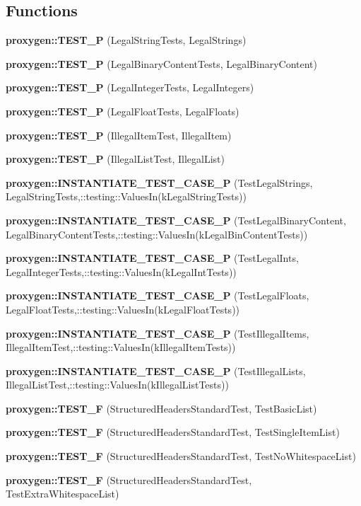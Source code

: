\subsection*{Functions}
\begin{DoxyCompactItemize}
\item 
{\bf proxygen\+::\+T\+E\+S\+T\+\_\+P} (Legal\+String\+Tests, Legal\+Strings)
\item 
{\bf proxygen\+::\+T\+E\+S\+T\+\_\+P} (Legal\+Binary\+Content\+Tests, Legal\+Binary\+Content)
\item 
{\bf proxygen\+::\+T\+E\+S\+T\+\_\+P} (Legal\+Integer\+Tests, Legal\+Integers)
\item 
{\bf proxygen\+::\+T\+E\+S\+T\+\_\+P} (Legal\+Float\+Tests, Legal\+Floats)
\item 
{\bf proxygen\+::\+T\+E\+S\+T\+\_\+P} (Illegal\+Item\+Test, Illegal\+Item)
\item 
{\bf proxygen\+::\+T\+E\+S\+T\+\_\+P} (Illegal\+List\+Test, Illegal\+List)
\item 
{\bf proxygen\+::\+I\+N\+S\+T\+A\+N\+T\+I\+A\+T\+E\+\_\+\+T\+E\+S\+T\+\_\+\+C\+A\+S\+E\+\_\+P} (Test\+Legal\+Strings, Legal\+String\+Tests,\+::testing\+::\+Values\+In(k\+Legal\+String\+Tests))
\item 
{\bf proxygen\+::\+I\+N\+S\+T\+A\+N\+T\+I\+A\+T\+E\+\_\+\+T\+E\+S\+T\+\_\+\+C\+A\+S\+E\+\_\+P} (Test\+Legal\+Binary\+Content, Legal\+Binary\+Content\+Tests,\+::testing\+::\+Values\+In(k\+Legal\+Bin\+Content\+Tests))
\item 
{\bf proxygen\+::\+I\+N\+S\+T\+A\+N\+T\+I\+A\+T\+E\+\_\+\+T\+E\+S\+T\+\_\+\+C\+A\+S\+E\+\_\+P} (Test\+Legal\+Ints, Legal\+Integer\+Tests,\+::testing\+::\+Values\+In(k\+Legal\+Int\+Tests))
\item 
{\bf proxygen\+::\+I\+N\+S\+T\+A\+N\+T\+I\+A\+T\+E\+\_\+\+T\+E\+S\+T\+\_\+\+C\+A\+S\+E\+\_\+P} (Test\+Legal\+Floats, Legal\+Float\+Tests,\+::testing\+::\+Values\+In(k\+Legal\+Float\+Tests))
\item 
{\bf proxygen\+::\+I\+N\+S\+T\+A\+N\+T\+I\+A\+T\+E\+\_\+\+T\+E\+S\+T\+\_\+\+C\+A\+S\+E\+\_\+P} (Test\+Illegal\+Items, Illegal\+Item\+Test,\+::testing\+::\+Values\+In(k\+Illegal\+Item\+Tests))
\item 
{\bf proxygen\+::\+I\+N\+S\+T\+A\+N\+T\+I\+A\+T\+E\+\_\+\+T\+E\+S\+T\+\_\+\+C\+A\+S\+E\+\_\+P} (Test\+Illegal\+Lists, Illegal\+List\+Test,\+::testing\+::\+Values\+In(k\+Illegal\+List\+Tests))
\item 
{\bf proxygen\+::\+T\+E\+S\+T\+\_\+F} (Structured\+Headers\+Standard\+Test, Test\+Basic\+List)
\item 
{\bf proxygen\+::\+T\+E\+S\+T\+\_\+F} (Structured\+Headers\+Standard\+Test, Test\+Single\+Item\+List)
\item 
{\bf proxygen\+::\+T\+E\+S\+T\+\_\+F} (Structured\+Headers\+Standard\+Test, Test\+No\+Whitespace\+List)
\item 
{\bf proxygen\+::\+T\+E\+S\+T\+\_\+F} (Structured\+Headers\+Standard\+Test, Test\+Extra\+Whitespace\+List)
\end{DoxyCompactItemize}
